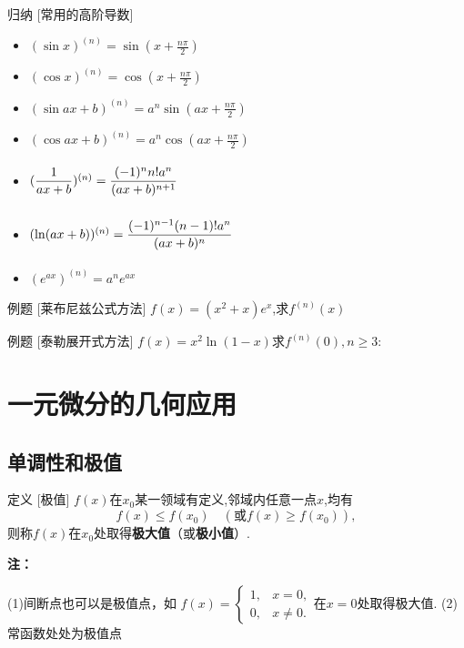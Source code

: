 \documentclass[a4paper,12pt,oneside,fontset=none]{ctexbook}
\renewcommand{\ge}{\geqslant}
\renewcommand{\geq}{\geqslant}
\renewcommand{\le}{\leqslant}
\let\olddfrac\dfrac
\renewcommand{\dfrac}[2]{
    \olddfrac{#1\vrule width 0pt height 1.15em depth 0em}{#2\vrule width 0pt height 0em depth 0.6em}
}
\newenvironment{induction}[1][]{\begin{thmBox}{归纳}{#1}}{\end{thmBox}}
\newcounter{definition}[chapter]
\newenvironment{definition}[1][]{\begin{defBox}{定义}{#1}}{\end{defBox}}
\newcounter{example}[chapter]
\newenvironment{example}[1][]{\begin{exBox}{例题}{#1}}{\end{exBox}}
\newenvironment{note}{
    \par\vspace{0.5em}\noindent
    \textbf{\color{NoteColor} 注：}
}{
    \par\vspace{0.5em}
}
\numberwithin{equation}{chapter}
\begin{document}
\begin{induction}
    [常用的高阶导数]
\begin{itemize}
    \item $(\sin x)^{(n)} = \sin(x + \frac{n\pi}{2})$
    \item $(\cos x)^{(n)} = \cos(x +\frac{n\pi}{2})$
    \item $(\sin ax + b)^{(n)} = a^n\sin(ax + \frac{n\pi}{2})$
    \item $(\cos ax + b)^{(n)} = a^n\cos(ax + \frac{n\pi}{2})$
    \item $(\dfrac{1}{ax+b})^{(n)} = \dfrac{(-1)^n n! a^n}{(ax+b)^{n+1}}$
    \item $(\ln(ax+b))^{(n)} = \dfrac{(-1)^{n-1} (n-1)! a^n}{(ax+b)^n}$
    \item $(e^{ax})^{(n)} = a^n e^{ax}$
\end{itemize}
\end{induction}


\begin{example}
    [莱布尼兹公式方法]
$f(x) = (x^2 + x)e^x$,求$f^{(n)}(x)$
\end{example}

\begin{example}
    [泰勒展开式方法]
$f(x) = x^2\ln(1-x)$求$f^{(n)}(0), n\geq3:$
\end{example}




\chapter{一元微分的几何应用}

\section{单调性和极值}

\begin{definition}
    [极值]
$f(x)$在$x_0$某一领域有定义,邻域内任意一点$x$,均有
\[
    f(x) \le f(x_0) \quad (\text{或} f(x) \ge f(x_0)),
\]
则称$f(x)$在$x_0$处取得\textbf{极大值}（或\textbf{极小值}）.
\end{definition}
\begin{note}
    (1)间断点也可以是极值点，如
    $f(x)=\begin{cases}
        1, & x = 0, \\
        0, & x \neq 0.
    \end{cases}$在$x=0$处取得极大值.
    (2)常函数处处为极值点
\end{note}
\end{document}
